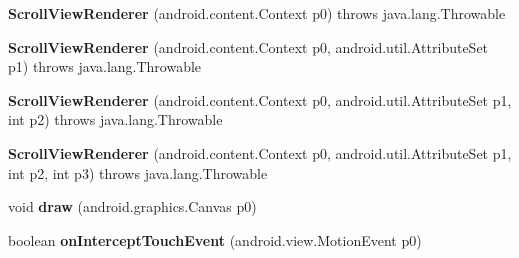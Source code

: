\begin{DoxyCompactItemize}
\item 
\mbox{\label{classmd5b60ffeb829f638581ab2bb9b1a7f4f3f_1_1_scroll_view_renderer_a02512d520220cf6181e8a53806b72506}} 
{\bfseries Scroll\+View\+Renderer} (android.\+content.\+Context p0)  throws java.\+lang.\+Throwable 	
\item 
\mbox{\label{classmd5b60ffeb829f638581ab2bb9b1a7f4f3f_1_1_scroll_view_renderer_ad686631aae6194ffcd34b7e3a9c0643d}} 
{\bfseries Scroll\+View\+Renderer} (android.\+content.\+Context p0, android.\+util.\+Attribute\+Set p1)  throws java.\+lang.\+Throwable 	
\item 
\mbox{\label{classmd5b60ffeb829f638581ab2bb9b1a7f4f3f_1_1_scroll_view_renderer_a476765090c78d15df5e61c632e53be4f}} 
{\bfseries Scroll\+View\+Renderer} (android.\+content.\+Context p0, android.\+util.\+Attribute\+Set p1, int p2)  throws java.\+lang.\+Throwable 	
\item 
\mbox{\label{classmd5b60ffeb829f638581ab2bb9b1a7f4f3f_1_1_scroll_view_renderer_a4e029c6c82f12c4db7e20a8ec6d888e9}} 
{\bfseries Scroll\+View\+Renderer} (android.\+content.\+Context p0, android.\+util.\+Attribute\+Set p1, int p2, int p3)  throws java.\+lang.\+Throwable 	
\item 
\mbox{\label{classmd5b60ffeb829f638581ab2bb9b1a7f4f3f_1_1_scroll_view_renderer_aae3343e25e199d02c22d1e33b37138a3}} 
void {\bfseries draw} (android.\+graphics.\+Canvas p0)
\item 
\mbox{\label{classmd5b60ffeb829f638581ab2bb9b1a7f4f3f_1_1_scroll_view_renderer_a479edb806c389229f367e7fdf2c58ece}} 
boolean {\bfseries on\+Intercept\+Touch\+Event} (android.\+view.\+Motion\+Event p0)
\item 
\mbox{\label{classmd5b60ffeb829f638581ab2bb9b1a7f4f3f_1_1_scroll_view_renderer_a4581815eede4c1676de1f11fc07cb9c4}} 

\end{DoxyCompactItemize}
